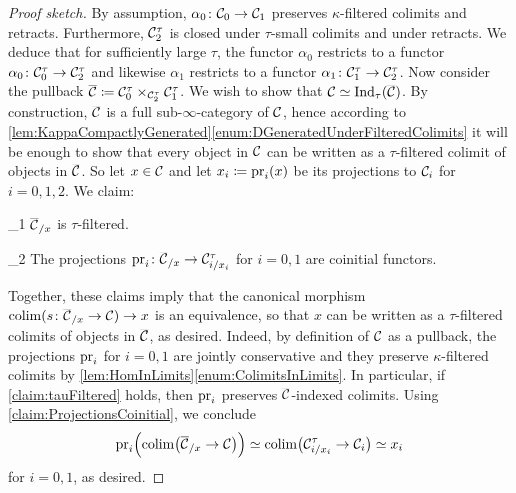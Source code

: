 \begin{proof}[Proof sketch]
	By assumption, $\alpha_0\colon \mathcal{C}_0\rightarrow \mathcal{C}_1$ preserves $\kappa$-filtered colimits and retracts. Furthermore, $\mathcal{C}_2^\tau$ is closed under $\tau$-small colimits and under retracts. We deduce that for sufficiently large $\tau$, the functor $\alpha_0$ restricts to a functor $\alpha_0\colon \mathcal{C}_0^\tau\rightarrow \mathcal{C}_2^\tau$ and likewise $\alpha_1$ restricts to a functor $\alpha_1\colon \mathcal{C}_1^\tau\rightarrow \mathcal{C}_2^\tau$. Now consider the pullback $\ov\Cc\coloneqq \Cc_0^\tau\times_{\Cc_2^\tau}\Cc_1^\tau$. We wish to show that $\Cc\simeq \cat{Ind}_\tau(\ov\Cc)$. By construction, $\ov\Cc$ is a full sub-$\infty$-category of $\mathcal{C}$, hence according to \cref{lem:KappaCompactlyGenerated}\cref{enum:DGeneratedUnderFilteredColimits} it will be enough to show that every object in $\mathcal{C}$ can be written as a $\tau$-filtered colimit of objects in $\ov\Cc$. So let $x\in \mathcal{C}$ and let $x_i\coloneqq \operatorname{pr}_i(x)$ be its projections to $\mathcal{C}_i$ for $i=0,1,2$. We claim:
	\begin{alphanumerate}\itshape
		\item[\boxtimes_1] $\ov\Cc_{/x}$ is $\tau$-filtered.\label{claim:tauFiltered}
		\item[\boxtimes_2] The projections $\pr_i\colon \ov\Cc_{/x}\rightarrow \Cc_{i/x_i}^\tau$ for $i=0,1$ are coinitial functors.\label{claim:ProjectionsCoinitial}
	\end{alphanumerate}
	Together, these claims imply that the canonical morphism $\colimit(s\colon \ov\Cc_{/x}\rightarrow \Cc)\rightarrow x$ is an equivalence, so that $x$ can be written as a $\tau$-filtered colimits of objects in $\ov\Cc$, as desired. Indeed, by definition of $\mathcal{C}$ as a pullback, the projections $\operatorname{pr}_i$ for $i=0,1$ are jointly conservative and they preserve $\kappa$-filtered colimits by \cref{lem:HomInLimits}\cref{enum:ColimitsInLimits}. In particular, if \cref{claim:tauFiltered} holds, then $\operatorname{pr}_i$ preserves $\ov\Cc$-indexed colimits. Using \cref{claim:ProjectionsCoinitial}, we conclude
	\begin{equation*}
		\pr_i\Bigl(\colimit\left(\ov\Cc_{/x}\rightarrow \Cc\right)\Bigr)\simeq  \colimit\bigl(\Cc_{i/x_i}^\tau\rightarrow \Cc_i\bigr)\simeq x_i
	\end{equation*}
	for $i=0,1$, as desired.
	

\end{proof}
